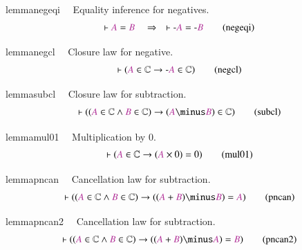 \begin{restatable}{lemma}{negeqi}~~ Equality inference for negatives. 
~
\begin{align}
\vdash \mc{A} = \mc{B}\quad\Rightarrow\quad \vdash \textrm{-} \mc{A} =
    \textrm{-} \mc{B}\label{eq:negeqi}\tag{negeqi}
\end{align}
\end{restatable}

\begin{restatable}{lemma}{negcl}~~ Closure law for negative.  ~
\begin{align}
\vdash ( \mc{A} \in \mathbb{C} \rightarrow \textrm{-} \mc{A} \in \mathbb{C}
    )\label{eq:negcl}\tag{negcl}
\end{align}
\end{restatable}

\begin{restatable}{lemma}{subcl}~~ Closure law for subtraction.  ~
       ~
\begin{align}
\vdash ( ( \mc{A} \in \mathbb{C} \wedge \mc{B} \in \mathbb{C} ) \rightarrow (
    \mc{A} \minus \mc{B} ) \in \mathbb{C} )\label{eq:subcl}\tag{subcl}
\end{align}
\end{restatable}

\begin{restatable}{lemma}{mul01}~~ Multiplication by $0$.    ~
\begin{align}
\vdash ( \mc{A} \in \mathbb{C} \rightarrow ( \mc{A} \times 0 ) = 0
    )\label{eq:mul01}\tag{mul01}
\end{align}
\end{restatable}

\begin{restatable}{lemma}{pncan}~~ Cancellation law for subtraction. 
~
     ~
\begin{align}
\vdash ( ( \mc{A} \in \mathbb{C} \wedge \mc{B} \in \mathbb{C} ) \rightarrow ( (
    \mc{A} + \mc{B} ) \minus \mc{B} ) = \mc{A} )\label{eq:pncan}\tag{pncan}
\end{align}
\end{restatable}

\begin{restatable}{lemma}{pncan2}~~ Cancellation law for subtraction. 
~
\begin{align}
\vdash ( ( \mc{A} \in \mathbb{C} \wedge \mc{B} \in \mathbb{C} ) \rightarrow ( (
    \mc{A} + \mc{B} ) \minus \mc{A} ) = \mc{B} )\label{eq:pncan2}\tag{pncan2}
\end{align}
\end{restatable}

